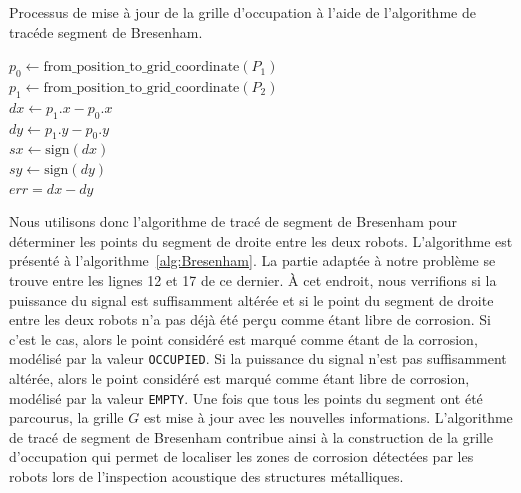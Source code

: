 \documentclass[francais,RandD]{rapportPFE}
\begin{document}
			\begin{algorithm}[h!]
				\caption{Processus de mise à jour de la grille d'occupation à l'aide de l'algorithme de tracéde segment de Bresenham.}
				\label{alg:Bresenham}
				$p_0 \gets \text{from\_position\_to\_grid\_coordinate}(P_1)$ \\
				$p_1 \gets \text{from\_position\_to\_grid\_coordinate}(P_2)$ \\
				$dx \gets p_1.x - p_0.x$ \\
				$dy \gets p_1.y - p_0.y$ \\
				$sx \gets \text{sign}(dx)$ \\
				$sy \gets \text{sign}(dy)$ \\
				$err = dx - dy$ \\
			\end{algorithm}

			Nous utilisons donc l'algorithme de tracé de segment de Bresenham pour déterminer les points du segment de droite entre les deux robots.
			L'algorithme est présenté à l'algorithme~\ref{alg:Bresenham}. La partie adaptée à notre problème se trouve entre les lignes 12 et 17 de ce dernier.
			À cet endroit, nous verrifions si la puissance du signal est suffisamment altérée et si le point du segment de droite entre les deux robots n'a pas déjà été perçu comme étant libre de corrosion.
			Si c'est le cas, alors le point considéré est marqué comme étant de la corrosion, modélisé par la valeur \texttt{OCCUPIED}.
			Si la puissance du signal n'est pas suffisamment altérée, alors le point considéré est marqué comme étant libre de corrosion, modélisé par la valeur \texttt{EMPTY}.
			Une fois que tous les points du segment ont été parcourus, la grille $G$ est mise à jour avec les nouvelles informations.
			L'algorithme de tracé de segment de Bresenham contribue ainsi à la construction de la grille d'occupation qui permet de localiser les zones de corrosion détectées par les robots lors de l'inspection acoustique des structures métalliques.
\end{document}
